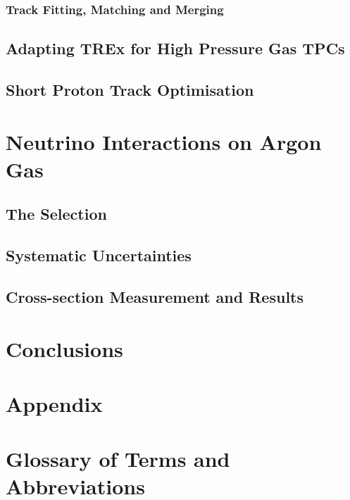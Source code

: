 \documentclass[a4paper, 11pt]{report}
\begin{document}
\subsection{Track Fitting, Matching and Merging}
\section{Adapting TREx for High Pressure Gas TPCs}
\section{Short Proton Track Optimisation}

\chapter{Neutrino Interactions on Argon Gas}
\section{The Selection}
\section{Systematic Uncertainties}
\section{Cross-section Measurement and Results}

\chapter{Conclusions}


\chapter*{Appendix}


\chapter*{Glossary of Terms and Abbreviations}




\end{document}
